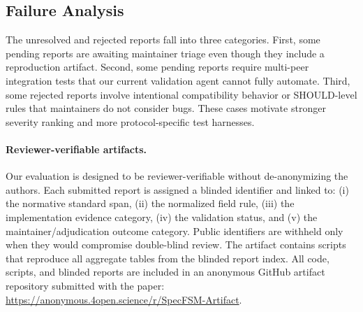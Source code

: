 \subsection{Failure Analysis}

The unresolved and rejected reports fall into three categories. First, some
pending reports are awaiting maintainer triage even though they include a
reproduction artifact. Second, some pending reports require multi-peer
integration tests that our current validation agent cannot fully automate.
Third, some rejected reports involve intentional compatibility behavior or
SHOULD-level rules that maintainers do not consider bugs. These cases motivate
stronger severity ranking and more protocol-specific test harnesses.

\paragraph{Reviewer-verifiable artifacts.}
Our evaluation is designed to be reviewer-verifiable without de-anonymizing the
authors. Each submitted report is assigned a blinded identifier and linked to:
(i) the normative standard span, (ii) the normalized field rule, (iii) the
implementation evidence category, (iv) the validation status, and (v) the
maintainer/adjudication outcome category. Public identifiers are withheld only
when they would compromise double-blind review. The artifact contains scripts
that reproduce all aggregate tables from the blinded report index. All code,
scripts, and blinded reports are included in an anonymous GitHub artifact
repository submitted with the paper:
\url{https://anonymous.4open.science/r/SpecFSM-Artifact}.
